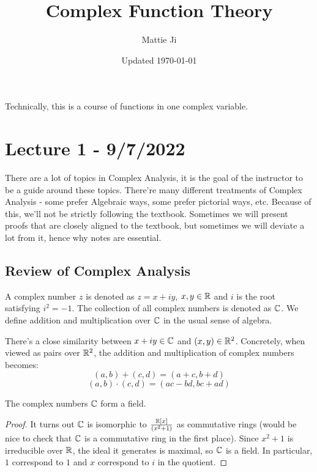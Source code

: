 \documentclass{article}
\title{Complex Function Theory}
\author{Mattie Ji}
\date{Updated \today}
\begin{document}
\maketitle

\noindent Technically, this is a course of functions in one complex variable.

\newpage
\section{Lecture 1 - 9/7/2022}
There are a lot of topics in Complex Analysis, it is the goal of the instructor to be a guide around these topics. There're many different treatments of Complex Analysis - some prefer Algebraic ways, some prefer pictorial ways, etc. Because of this, we'll not be strictly following the textbook. Sometimes we will present proofs that are closely aligned to the textbook, but sometimes we will deviate a lot from it, hence why notes are essential.

\subsection{Review of Complex Analysis}

\begin{definition}
    A complex number $z$ is denoted as $z = x + iy$, $x, y \in \mathbb{R}$ and $i$ is the root satisfying $i^2 = -1$. The collection of all complex numbers is denoted as $\mathbb{C}$. We define addition and multiplication over $\mathbb{C}$ in the usual sense of algebra.
\end{definition}

    \noindent There's a close similarity between $x + iy \in \mathbb{C}$ and $(x, y) \in \mathbb{R}^2$. Concretely, when viewed as pairs over $\mathbb{R}^2$, the addition and multiplication of complex numbers becomes:
    \[(a, b) + (c, d) = (a + c, b + d)\]
    \[(a, b) \cdot (c, d) = (ac - bd, bc + ad)\]

\begin{proposition}
    The complex numbers $\mathbb{C}$ form a field.
\end{proposition}

\begin{proof}
    It turns out $\mathbb{C}$ is isomorphic to $\frac{\mathbb{R}[x]}{(x^2 + 1)}$ as commutative rings (would be nice to check that $\mathbb{C}$ is a commutative ring in the first place). Since $x^2 + 1$ is irreducible over $\mathbb{R}$, the ideal it generates is maximal, so $\mathbb{C}$ is a field. In particular, $1$ correspond to $1$ and $x$ correspond to $i$ in the quotient.
\end{proof}
\end{document}
